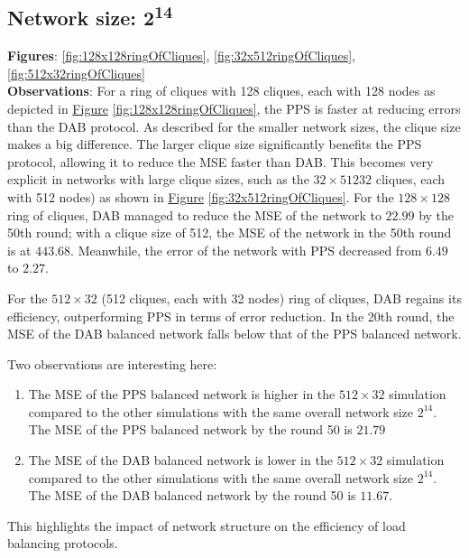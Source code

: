 \subsection{Network size: 2\textsuperscript{14}}
\textbf{Figures}: \ref{fig:128x128ringOfCliques}, \ref{fig:32x512ringOfCliques}, \ref{fig:512x32ringOfCliques}\\
\textbf{Observations}: For a ring of cliques with 128 cliques, each with 128 nodes as depicted in \hyperref[fig:128x128ringOfCliques]{Figure} \ref{fig:128x128ringOfCliques}, the PPS is faster at reducing errors than the DAB protocol. As described for the smaller network sizes, the clique size makes a big difference. The larger clique size significantly benefits the PPS protocol, allowing it to reduce the MSE faster than DAB. This becomes very explicit in networks with large clique sizes, such as the $32 \times 512$32 cliques, each with 512 nodes) as shown in \hyperref[fig:32x512ringOfCliques]{Figure} \ref{fig:32x512ringOfCliques}. For the $128 \times 128$ ring of cliques, DAB managed to reduce the MSE of the network to $22.99$ by the 50th round; with a clique size of 512, the MSE of the network in the 50th round is at $443.68$. Meanwhile, the error of the network with PPS decreased from $6.49$ to $2.27$.

For the $512 \times 32$ (512 cliques, each with 32 nodes) ring of cliques, DAB regains its efficiency, outperforming PPS in terms of error reduction. In the 20th round, the MSE of the DAB balanced network falls below that of the PPS balanced network.

Two observations are interesting here:
\begin{enumerate}
    \item The MSE of the PPS balanced network is higher in the $512 \times 32$ simulation compared to the other simulations with the same overall network size $2^{14}$. The MSE of the PPS balanced network by the round 50 is $21.79$
    \item The MSE of the DAB balanced network is lower in the $512 \times 32$ simulation compared to the other simulations with the same overall network size $2^{14}$. The MSE of the DAB balanced network by the round 50 is $11.67$.
\end{enumerate}
This highlights the impact of network structure on the efficiency of load balancing protocols.



